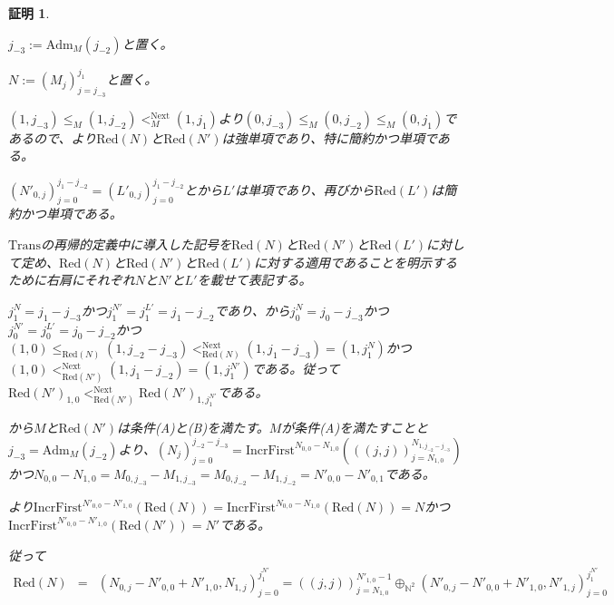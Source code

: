 \documentclass[dvipdfmx,uplatex]{jsarticle}
\theoremstyle{customnonumberbreakfortheorem}
\theoremstyle{customnonumberbreakforproof}
\newtheorem{hideableproof}{証明}
\begin{document}
\begin{hideableproof}
	\begin{indented}
		\item \(j_{-3} := \textrm{Adm}_M(j_{-2})\)と置く。
		\item \(N := (M_j)_{j=j_{-3}}^{j_1}\)と置く。
		\item \((1,j_{-3}) \leq_M (1,j_{-2}) <_M^{\textrm{Next}} (1,j_1)\)より\((0,j_{-3}) \leq_M (0,j_{-2}) \leq_M (0,j_1)\)であるので、より\(\textrm{Red}(N)\)と\(\textrm{Red}(N')\)は強単項であり、特に簡約かつ単項である。
		\item \((N'_{0,j})_{j=0}^{j_1-j_{-2}} = (L'_{0,j})_{j=0}^{j_1-j_{-2}}\)とから\(L'\)は単項であり、再びから\(\textrm{Red}(L')\)は簡約かつ単項である。
		\item \(\textrm{Trans}\)の再帰的定義中に導入した記号を\(\textrm{Red}(N)\)と\(\textrm{Red}(N')\)と\(\textrm{Red}(L')\)に対して定め、\(\textrm{Red}(N)\)と\(\textrm{Red}(N')\)と\(\textrm{Red}(L')\)に対する適用であることを明示するために右肩にそれぞれ\(N\)と\(N'\)と\(L'\)を載せて表記する。
		\item \(j_1^N = j_1-j_{-3}\)かつ\(j_1^{N'} = j_1^{L'} = j_1-j_{-2}\)であり、から\(j_0^N = j_0-j_{-3}\)かつ\(j_0^{N'} = j_0^{L'} = j_0-j_{-2}\)かつ\((1,0) \leq_{\textrm{Red}(N)} (1,j_{-2}-j_{-3}) <_{\textrm{Red}(N)}^{\textrm{Next}} (1,j_1-j_{-3}) = (1,j_1^N)\)かつ\((1,0) <_{\textrm{Red}(N')}^{\textrm{Next}} (1,j_1-j_{-2}) = (1,j_1^{N'})\)である。従って\(\textrm{Red}(N')_{1,0} <_{\textrm{Red}(N')}^{\textrm{Next}} \textrm{Red}(N')_{1,j_1^{N'}}\)である。
		\item {}から\(M\)と\(\textrm{Red}(N')\)は条件(A)と(B)を満たす。\(M\)が条件(A)を満たすことと\(j_{-3} = \textrm{Adm}_M(j_{-2})\)より、\((N_j)_{j=0}^{j_{-2}-j_{-3}} = \textrm{IncrFirst}^{N_{0,0}-N_{1,0}}(((j,j))_{j=N_{1,0}}^{N_{1,j_{-2}-j_{-3}}})\)かつ\(N_{0,0}-N_{1,0} = M_{0,j_{-3}}-M_{1,j_{-3}} = M_{0,j_{-2}}-M_{1,j_{-2}} = N'_{0,0}-N'_{0,1}\)である。
		\item {}より\(\textrm{IncrFirst}^{N'_{0,0}-N'_{1,0}}(\textrm{Red}(N)) = \textrm{IncrFirst}^{N_{0,0}-N_{1,0}}(\textrm{Red}(N)) = N\)かつ\(\textrm{IncrFirst}^{N'_{0,0}-N'_{1,0}}(\textrm{Red}(N')) = N'\)である。
		\item 従って
		\begin{eqnarray*}
		\textrm{Red}(N) & = & (N_{0,j}-N'_{0,0}+N'_{1,0},N_{1,j})_{j=0}^{j_1^{N'}} = ((j,j))_{j=N_{1,0}}^{N'_{1,0}-1} \oplus_{\mathbb{N}^2} (N'_{0,j}-N'_{0,0}+N'_{1,0},N'_{1,j})_{j=0}^{j_1^{N'}} \\

\end{eqnarray*}
\end{indented}
\end{hideableproof}
\end{document}
